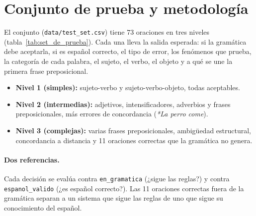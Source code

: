 \section{Conjunto de prueba y metodología}
\label{sec:set_de_prueba}

El conjunto (\texttt{data/test\_set.csv}) tiene 73 oraciones en tres niveles
(tabla~\ref{tab:set_de_prueba}). Cada una lleva la salida esperada: si la gramática debe
aceptarla, si es español correcto, el tipo de error, los fenómenos que prueba, la categoría de
cada palabra, el sujeto, el verbo, el objeto y a qué se une la primera frase preposicional.
\begin{itemize}
  \item \textbf{Nivel 1 (simples):} sujeto-verbo y sujeto-verbo-objeto, todas aceptables.
  \item \textbf{Nivel 2 (intermedias):} adjetivos, intensificadores, adverbios y frases
    preposicionales, más errores de concordancia (\emph{*La perro come}).
  \item \textbf{Nivel 3 (complejas):} varias frases preposicionales, ambigüedad estructural,
    concordancia a distancia y 11 oraciones correctas que la gramática no genera.
\end{itemize}

\begin{table}[h]
  \centering
  \small
  \caption{Composición del conjunto de prueba.}
  \label{tab:set_de_prueba}
\end{table}

\paragraph{Dos referencias.} Cada decisión se evalúa contra \texttt{en\_gramatica} (¿sigue las
reglas?) y contra \texttt{espanol\_valido} (¿es español correcto?). Las 11 oraciones correctas
fuera de la gramática separan a un sistema que sigue las reglas de uno que sigue su conocimiento
del español.

